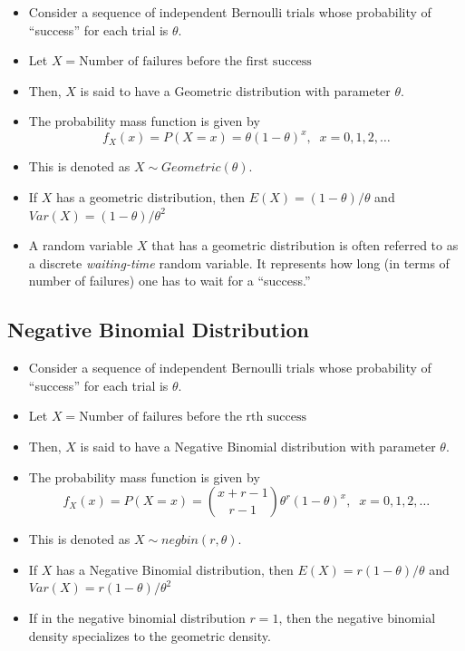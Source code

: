 \documentclass[]{book}
\begin{document}
\begin{itemize}
\item
  Consider a sequence of independent Bernoulli trials whose probability of ``success'' for each trial is \(\theta\).
\item
  Let \(X= \text{Number of failures before the first success}\)
\item
  Then, \(X\) is said to have a Geometric distribution with parameter \(\theta.\)
\item
  The probability mass function is given by
  \[f_X(x)= P(X=x)= \theta (1-\theta)^x , \;\; x=0,1,2,\dots\]
\item
  This is denoted as \(X \sim Geometric(\theta).\)
\item
  If \(X\) has a geometric distribution, then \(E(X) = (1-\theta)/\theta\) and \(Var(X) = (1-\theta)/\theta^2\)
\item
  A random variable \(X\) that has a geometric distribution is often referred to as a discrete \emph{waiting-time} random variable. It represents how long (in terms of number of failures) one has to wait for a ``success.''
\end{itemize}

\hypertarget{negative-binomial-distribution}{%
\subsection{Negative Binomial Distribution}\label{negative-binomial-distribution}}

\begin{itemize}
\item
  Consider a sequence of independent Bernoulli trials whose probability of ``success'' for each trial is \(\theta\).
\item
  Let \(X= \text{Number of failures before the rth success}\)
\item
  Then, \(X\) is said to have a Negative Binomial distribution with parameter \(\theta.\)
\item
  The probability mass function is given by
  \[f_X(x)= P(X=x)= {x+r-1\choose r-1} \theta^r (1-\theta)^x , \;\; x=0,1,2,\dots\]
\item
  This is denoted as \(X \sim negbin(r,\theta).\)
\item
  If \(X\) has a Negative Binomial distribution, then \(E(X) = r(1-\theta)/\theta\) and \(Var(X) = r(1-\theta)/\theta^2\)
\item
  If in the negative binomial distribution \(r=1\), then the negative binomial density specializes to the geometric density. 
\end{itemize}
\end{document}
